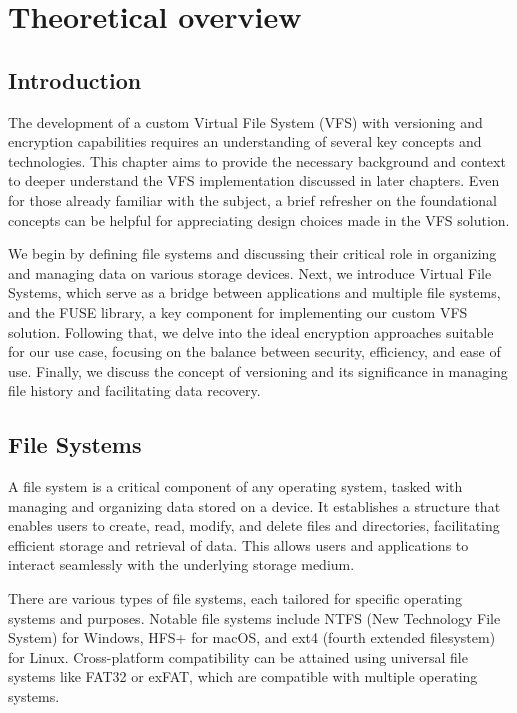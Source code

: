 \chapter{Theoretical overview}
\label{chap:refs}

\section{Introduction}\label{sec:introduction}

The development of a custom Virtual File System (VFS) with versioning and encryption capabilities requires an understanding of several key concepts and technologies.
This chapter aims to provide the necessary background and context to deeper understand the VFS implementation discussed in later chapters.
Even for those already familiar with the subject, a brief refresher on the foundational concepts can be helpful for appreciating design choices made in the VFS solution.

We begin by defining file systems and discussing their critical role in organizing and managing data on various storage devices.
Next, we introduce Virtual File Systems, which serve as a bridge between applications and multiple file systems, and the FUSE library, a key component for implementing our custom VFS solution.
Following that, we delve into the ideal encryption approaches suitable for our use case, focusing on the balance between security, efficiency, and ease of use.
Finally, we discuss the concept of versioning and its significance in managing file history and facilitating data recovery.

\section{File Systems}\label{sec:file-systems}

A file system is a critical component of any operating system, tasked with managing and organizing data stored on a device.
It establishes a structure that enables users to create, read, modify, and delete files and directories, facilitating efficient storage and retrieval of data.
This allows users and applications to interact seamlessly with the underlying storage medium.

There are various types of file systems, each tailored for specific operating systems and purposes.
Notable file systems include NTFS (New Technology File System) for Windows, HFS+ for macOS, and ext4 (fourth extended filesystem) for Linux.
Cross-platform compatibility can be attained using universal file systems like FAT32 or exFAT, which are compatible with multiple operating systems.

